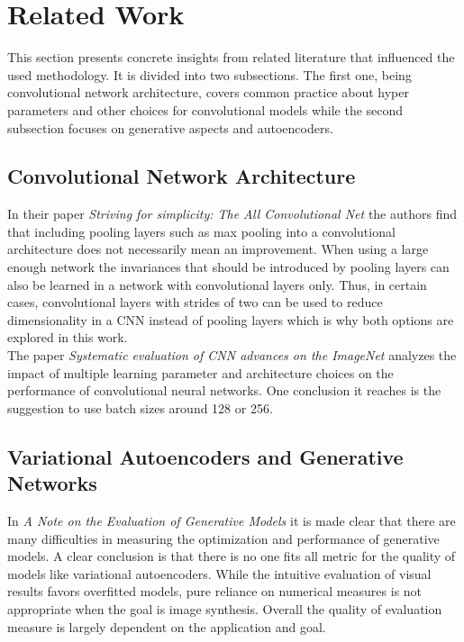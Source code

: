 \section{Related Work}

This section presents concrete insights from related literature that influenced the used methodology. It is 
divided into two subsections. The first one, being convolutional network architecture, covers common practice about
hyper parameters and other choices for convolutional models while the second subsection focuses on generative aspects
and autoencoders.

\subsection{Convolutional Network Architecture}

In their paper \textit{Striving for simplicity: The All Convolutional Net} \parencite{2015-springenberg-striving}
the authors find that including pooling layers such as max pooling into a convolutional architecture does not 
necessarily mean an improvement. When using a large enough network the invariances that should be
introduced by pooling layers can also be learned in a network with convolutional layers only. Thus, in certain cases,
convolutional layers with strides of two can be used to reduce dimensionality in a CNN instead of pooling layers
which is why both options are explored in this work.
\\

The paper \textit{Systematic evaluation of CNN advances on the ImageNet} \parencite{2016-mishkin-systematic} analyzes
the impact of multiple learning parameter and architecture choices on the performance of convolutional neural networks.
One conclusion it reaches is the suggestion to use batch sizes around 128 or 256.

\subsection{Variational Autoencoders and Generative Networks}

In \textit{A Note on the Evaluation of Generative Models} \parencite{2015-theis-generative}
it is made clear that there are many difficulties in
measuring the optimization and performance of generative models. A clear conclusion is that there is no 
one fits all metric for the quality of models like variational autoencoders. While the intuitive evaluation
of visual results favors overfitted models, pure reliance on numerical measures is not appropriate when the
goal is image synthesis. Overall the quality of evaluation measure is largely dependent on the application
and goal.\\



